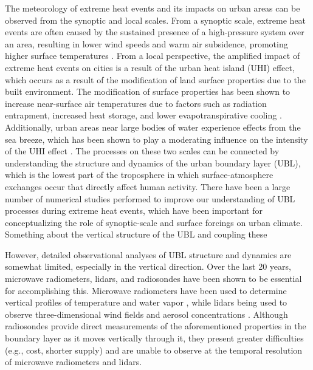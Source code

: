 \documentclass[11pt,a4paper]{article}
\begin{document}
The meteorology of extreme heat events and its impacts on urban areas can be observed from the synoptic and local scales. From a synoptic scale, extreme heat events are often caused by the sustained presence of a high-pressure system over an area, resulting in lower wind speeds and warm air subsidence, promoting higher surface temperatures \citep{black2004, miralles2014}. From a local perspective, the amplified impact of extreme heat events on cities is a result of the urban heat island (UHI) effect, which occurs as a result of the modification of land surface properties due to the built environment. The modification of surface properties has been shown to increase near-surface air temperatures due to factors such as radiation entrapment, increased heat storage, and lower evapotranspirative cooling \citep{chen2014, li2013, ramamurthy2017a, zhao2018}. Additionally, urban areas near large bodies of water experience effects from the sea breeze, which has been shown to play a moderating influence on the intensity of the UHI effect \citep{hu2016, jiang2019, stefanon2014}. The processes on these two scales can be connected by understanding the structure and dynamics of the urban boundary layer (UBL), which is the lowest part of the troposphere in which surface-atmosphere exchanges occur that directly affect human activity. There have been a large number of numerical studies performed to improve our understanding of UBL processes during extreme heat events, which have been important for conceptualizing the role of synoptic-scale and surface forcings on urban climate. Something about the vertical structure of the UBL and coupling these

However, detailed observational analyses of UBL structure and dynamics are somewhat limited, especially in the vertical direction. Over the last 20 years, microwave radiometers, lidars, and radiosondes have been shown to be essential for accomplishing this. Microwave radiometers have been used to determine vertical profiles of temperature and water vapor \citep{rose2005, wang2012}, while lidars being used to observe three-dimensional wind fields and aerosol concentrations \citep{grund2001}. Although radiosondes provide direct measurements of the aforementioned properties in the boundary layer as it moves vertically through it, they present greater difficulties (e.g., cost, shorter supply) and are unable to observe at the temporal resolution of microwave radiometers and lidars. 
\end{document}
